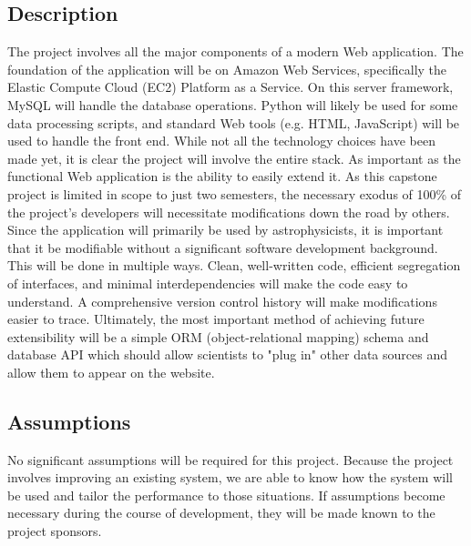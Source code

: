 \documentclass[12pt]{article}
\begin{document}
\begin{spacing}{1.5}
\subsection{Description}
The project involves all the major components of a modern Web application. The foundation of the application will be on Amazon Web Services, specifically the Elastic Compute Cloud (EC2) Platform as a Service. On this server framework, MySQL will handle the database operations. Python will likely be used for some data processing scripts, and standard Web tools (e.g. HTML, JavaScript) will be used to handle the front end. While not all the technology choices have been made yet, it is clear the project will involve the entire stack.
\newline \newline
As important as the functional Web application is the ability to easily extend it. As this capstone project is limited in scope to just two semesters, the necessary exodus of 100\% of the project's developers will necessitate modifications down the road by others. Since the application will primarily be used by astrophysicists, it is important that it be modifiable without a significant software development background. This will be done in multiple ways. Clean, well-written code, efficient segregation of interfaces, and minimal interdependencies will make the code easy to understand. A comprehensive version control history will make modifications easier to trace. Ultimately, the most important method of achieving future extensibility will be a simple ORM (object-relational mapping) schema and database API which should allow scientists to "plug in" other data sources and allow them to appear on the website.

\subsection{Assumptions}
No significant assumptions will be required for this project. Because the project involves improving an existing system, we are able to know how the system will be used and tailor the performance to those situations. If assumptions become necessary during the course of development, they will be made known to the project sponsors.

\newpage


\end{spacing}
\end{document}
